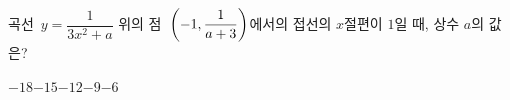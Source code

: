 곡선~$y=\dfrac{1}{3x^2+a}$ 위의 점~$\left(-1{,}\mkern3mu\mathopen{}\dfrac{1}{a+3}\right)$에서의 접선의 $x$절편이 $1$일 때, 상수 $a$의 값은?
\begin{choices32}{$-18$}{$-15$}{$-12$}{$-9$}{$-6$}\end{choices32}
